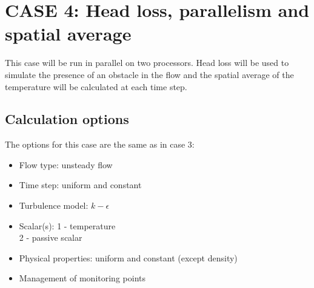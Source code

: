 %
% 
%
% 
% 
% 
%
\newpage
\section{CASE 4: Head loss, parallelism and spatial average}
\label{prg_case4}%
This case will be run in parallel on two processors. Head loss will be used to
simulate the presence of an obstacle in the flow and the spatial average of the
temperature will be calculated at each time step.

	\subsection{Calculation options}

The options for this case are the same as in case 3:
\begin{itemize}
\renewcommand{\labelitemi}{$\rightarrow$}
	\item Flow type: unsteady flow
	\item Time step: uniform and constant
	\item Turbulence model: $k-\epsilon$
	\item Scalar(s): 1 - temperature\\
      \hspace*{1.6cm} 2 - passive scalar
	\item Physical properties: uniform and constant (except density)
	\item Management of monitoring points
\end{itemize}


